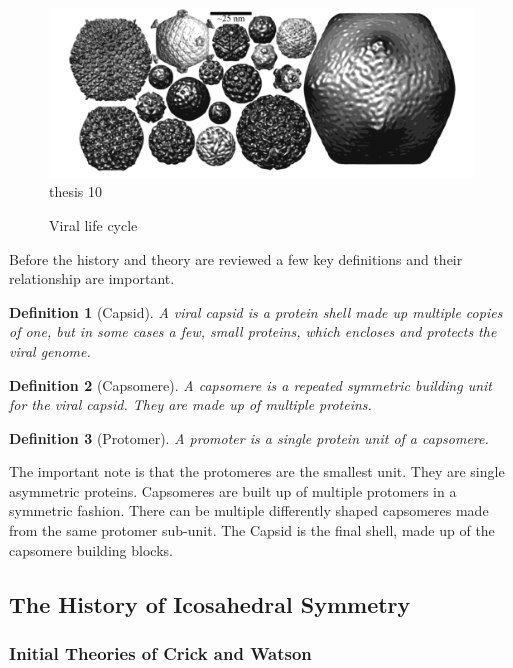 \documentclass[12pt,letter]{article}
\newtheorem*{definition*}{Definition}
\begin{document}
\begin{figure}[h]
	\caption{Viral life cycle}
	\centering
	\includegraphics[width = .95\textwidth]{viruses.pdf}
	\label{fig:virus_types}
	thesis 10
\end{figure}

Before the history and theory are reviewed a few key definitions and their relationship are important.

\begin{definition*}[Capsid]
A viral capsid is a protein shell made up multiple copies of one, but in some cases a few, small proteins, which encloses and protects the viral genome.
\end{definition*}
\begin{definition*}[Capsomere]
A capsomere is a repeated symmetric building unit for the viral capsid. They are made up of multiple proteins.
\end{definition*}
\begin{definition*}[Protomer]
A promoter is a single protein unit of a capsomere.
\end{definition*}

The important note is that the protomeres are the smallest unit. They are single asymmetric proteins. Capsomeres are built up of multiple protomers in a symmetric fashion. There can be multiple differently shaped capsomeres made from the same protomer sub-unit. The Capsid is the final shell, made up of the capsomere building blocks.

\subsection{The History of Icosahedral Symmetry} %

\subsubsection{Initial Theories of Crick and Watson} \label{sec:C&W}
\end{document}

